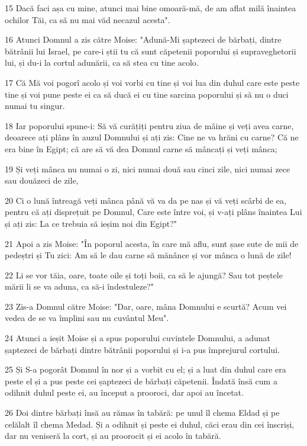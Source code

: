 \par 15 Dacă faci așa cu mine, atunci mai bine omoară-mă, de am aflat milă înaintea ochilor Tăi, ca să nu mai văd necazul acesta".
\par 16 Atunci Domnul a zis către Moise: "Adună-Mi șaptezeci de bărbați, dintre bătrânii lui Israel, pe care-i știi tu că sunt căpetenii poporului și supraveghetorii lui, și du-i la cortul adunării, ca să stea cu tine acolo.
\par 17 Că Mă voi pogorî acolo și voi vorbi cu tine și voi lua din duhul care este peste tine și voi pune peste ei ca să ducă ei cu tine sarcina poporului și să nu o duci numai tu singur.
\par 18 Iar poporului spune-i: Să vă curățiți pentru ziua de mâine și veți avea carne, deoarece ați plâns în auzul Domnului și ați zis: Cine ne va hrăni cu carne? Că ne era bine în Egipt; că are să vă dea Domnul carne să mâncați și veți mânca;
\par 19 Și veți mânca nu numai o zi, nici numai două sau cinci zile, nici numai zece sau douăzeci de zile,
\par 20 Ci o lună întreagă veți mânca până vă va da pe nas și vă veți scârbi de ea, pentru că ați disprețuit pe Domnul, Care este între voi, și v-ați plâns înaintea Lui și ați zis: La ce trebuia să ieșim noi din Egipt?"
\par 21 Apoi a zis Moise: "În poporul acesta, în care mă aflu, sunt șase sute de mii de pedeștri și Tu zici: Am să le dau carne să mănânce și vor mânca o lună de zile!
\par 22 Li se vor tăia, oare, toate oile și toți boii, ca să le ajungă? Sau tot peștele mării li se va aduna, ca să-i îndestuleze?"
\par 23 Zis-a Domnul către Moise: "Dar, oare, mâna Domnului e scurtă? Acum vei vedea de se va împlini sau nu cuvântul Meu".
\par 24 Atunci a ieșit Moise și a spus poporului cuvintele Domnului, a adunat șaptezeci de bărbați dintre bătrânii poporului și i-a pus împrejurul cortului.
\par 25 Și S-a pogorât Domnul în nor și a vorbit cu el; și a luat din duhul care era peste el și a pus peste cei șaptezeci de bărbați căpetenii. Îndată însă cum a odihnit duhul peste ei, au început a prooroci, dar apoi au încetat.
\par 26 Doi dintre bărbați însă au rămas în tabără: pe unul îl chema Eldad și pe celălalt îl chema Medad. Și a odihnit și peste ei duhul, căci erau din cei înscriși, dar nu veniseră la cort, și au proorocit și ei acolo în tabără.
